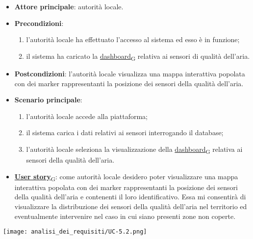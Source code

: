 \newpage

\begin{itemize}
	\item \textbf{Attore principale}: autorità locale.
	\item \textbf{Precondizioni}:
	      \begin{enumerate}
		      \item l'autorità locale ha effettuato l'accesso al sistema ed esso è in funzione;
		      \item il sistema ha caricato la \href{https://7last.github.io/docs/rtb/documentazione-interna/glossario\#dashboard}{dashboard\textsubscript{G}} relativa ai sensori di qualità dell'aria.
	      \end{enumerate}
	\item \textbf{Postcondizioni}: l'autorità locale visualizza una mappa interattiva popolata con dei marker rappresentanti la posizione dei sensori della qualità dell'aria.
	\item \textbf{Scenario principale}:
	      \begin{enumerate}
		      \item l'autorità locale accede alla piattaforma;
		      \item il sistema carica i dati relativi ai sensori interrogando il database;
		      \item l'autorità locale seleziona la visualizzazione della \href{https://7last.github.io/docs/rtb/documentazione-interna/glossario\#dashboard}{dashboard\textsubscript{G}} relativa ai sensori della qualità dell'aria.
	      \end{enumerate}
	\item \href{https://7last.github.io/docs/rtb/documentazione-interna/glossario\#user-story}{\textbf{User story}\textsubscript{G}}:
	      come autorità locale desidero poter visualizzare una mappa interattiva popolata con dei marker rappresentanti la posizione dei sensori della qualità dell'aria
	      e contenenti il loro identificativo. Essa mi consentirà di visualizzare la distribuzione dei sensori della qualità dell'aria nel territorio ed eventualmente intervenire nel caso in cui siano presenti zone non coperte.
\end{itemize}
\begin{center}
	\texttt{[image: analisi\_dei\_requisiti/UC-5.2.png]}
\end{center}


